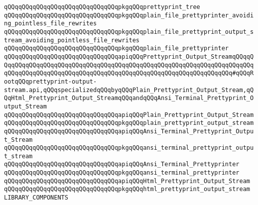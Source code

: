 \newline
\verb|qQQqqQQqqQQqqQQqqQQqqQQqqQQqqQQqpkgqQQqprettyprint_tree|\newline
\newline
\verb|qQQqqQQqqQQqqQQqqQQqqQQqqQQqqQQqpkgqQQqplain_file_prettyprinter_avoiding_pointless_file_rewrites|\newline
\verb|qQQqqQQqqQQqqQQqqQQqqQQqqQQqqQQqpkgqQQqplain_file_prettyprint_output_stream_avoiding_pointless_file_rewrites|\newline
\newline
\verb|qQQqqQQqqQQqqQQqqQQqqQQqqQQqqQQqpkgqQQqplain_file_prettyprinter|\newline
\newline
\verb|qQQqqQQqqQQqqQQqqQQqqQQqqQQqqQQqapiqQQqPrettyprint_Output_StreamqQQqqQQqqQQqqQQqqQQqqQQqqQQqqQQqqQQqqQQqqQQqqQQqqQQqqQQqqQQqqQQqqQQqqQQqqQQqqQQqqQQqqQQqqQQqqQQqqQQqqQQqqQQqqQQqqQQqqQQqqQQqqQQqqQQqqQQqqQQq#qQQqRootqQQqprettyprint-output-stream.api,qQQqspecializedqQQqbyqQQqPlain_Prettyprint_Output_Stream,qQQqHtml_Prettyprint_Output_StreamqQQqandqQQqAnsi_Terminal_Prettyprint_Output_Stream|\newline
\newline
\verb|qQQqqQQqqQQqqQQqqQQqqQQqqQQqqQQqapiqQQqPlain_Prettyprint_Output_Stream|\newline
\verb|qQQqqQQqqQQqqQQqqQQqqQQqqQQqqQQqpkgqQQqplain_prettyprint_output_stream|\newline
\newline
\verb|qQQqqQQqqQQqqQQqqQQqqQQqqQQqqQQqapiqQQqAnsi_Terminal_Prettyprint_Output_Stream|\newline
\verb|qQQqqQQqqQQqqQQqqQQqqQQqqQQqqQQqpkgqQQqansi_terminal_prettyprint_output_stream|\newline
\newline
\verb|qQQqqQQqqQQqqQQqqQQqqQQqqQQqqQQqapiqQQqAnsi_Terminal_Prettyprinter|\newline
\verb|qQQqqQQqqQQqqQQqqQQqqQQqqQQqqQQqpkgqQQqansi_terminal_prettyprinter|\newline
\newline
\verb|qQQqqQQqqQQqqQQqqQQqqQQqqQQqqQQqapiqQQqHtml_Prettyprint_Output_Stream|\newline
\verb|qQQqqQQqqQQqqQQqqQQqqQQqqQQqqQQqpkgqQQqhtml_prettyprint_output_stream|\newline
\newline
\newline
\newline
\verb|LIBRARY_COMPONENTS|\newline

